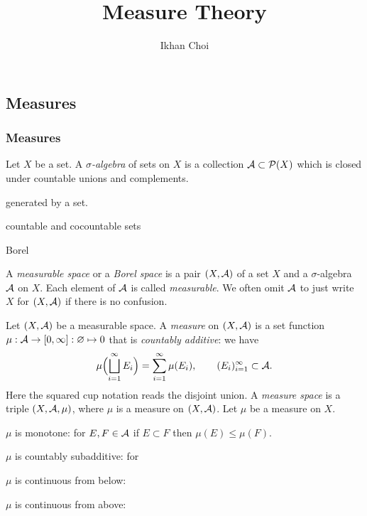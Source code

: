 \documentclass{../../large}
\begin{document}
\title{Measure Theory}
\author{Ikhan Choi}
\maketitle
\tableofcontents

\part{}





\chapter{Measures}


\section{Measures}

\begin{prb}
Let $X$ be a set.
A \emph{$\sigma$-algebra} of sets on $X$ is a collection $\mathcal{A}\subset\mathcal{P}(X)$ which is closed under countable unions and complements.
\begin{parts}
\item generated by a set.
\item countable and cocountable sets
\item Borel
\end{parts}
\end{prb}

\begin{prb}[Measures]
A \emph{measurable space} or a \emph{Borel space} is a pair $(X,\mathcal{A})$ of a set $X$ and a $\sigma$-algebra $\mathcal{A}$ on $X$.
Each element of $\mathcal{A}$ is called \emph{measurable}.
We often omit $\mathcal{A}$ to just write $X$ for $(X,\mathcal{A})$ if there is no confusion.

Let $(X,\mathcal{A})$ be a measurable space.
A \emph{measure} on $(X,\mathcal{A})$ is a set function $\mu:\mathcal{A}\to[0,\infty]:\varnothing\mapsto0$ that is \emph{countably additive}: we have
\[\mu\Bigl(\bigsqcup_{i=1}^\infty E_i\Bigr)=\sum_{i=1}^\infty\mu(E_i),\qquad(E_i)_{i=1}^\infty\subset\mathcal{A}.\]
Here the squared cup notation reads the disjoint union.
A \emph{measure space} is a triple $(X,\mathcal{A},\mu)$, where $\mu$ is a measure on $(X,\mathcal{A})$.
Let $\mu$ be a measure on $X$.
\begin{parts}
\item $\mu$ is monotone: for $E,F\in\mathcal{A}$ if $E\subset F$ then $\mu(E)\le\mu(F)$.
\item $\mu$ is countably subadditive: for
\item $\mu$ is continuous from below:
\item $\mu$ is continuous from above:
\end{parts}
\end{prb}
\end{document}
